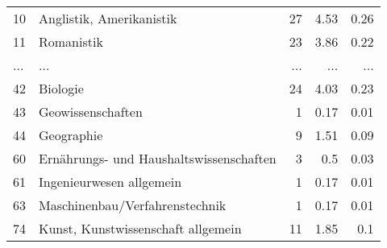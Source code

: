 \begin{longtable}{lXrrr}
        10 & \multicolumn{1}{X}{Anglistik, Amerikanistik} & %
          \num{27} &
          \num[round-mode=places,round-precision=2]{4,53} &
          \num[round-mode=places,round-precision=2]{0,26} \\
        11 & \multicolumn{1}{X}{Romanistik} & %
          \num{23} &
          \num[round-mode=places,round-precision=2]{3,86} &
          \num[round-mode=places,round-precision=2]{0,22} \\
       ... & ... & ... & ... & ... \\
        42 & \multicolumn{1}{X}{Biologie} & %
          \num{24} &
          \num[round-mode=places,round-precision=2]{4,03} &
          \num[round-mode=places,round-precision=2]{0,23} \\

        43 & \multicolumn{1}{X}{Geowissenschaften} & %
          \num{1} &
          \num[round-mode=places,round-precision=2]{0,17} &
          \num[round-mode=places,round-precision=2]{0,01} \\

        44 & \multicolumn{1}{X}{Geographie} & %
          \num{9} &
          \num[round-mode=places,round-precision=2]{1,51} &
          \num[round-mode=places,round-precision=2]{0,09} \\

        60 & \multicolumn{1}{X}{Ernährungs- und Haushaltswissenschaften} & %
          \num{3} &
          \num[round-mode=places,round-precision=2]{0,5} &
          \num[round-mode=places,round-precision=2]{0,03} \\

        61 & \multicolumn{1}{X}{Ingenieurwesen allgemein} & %
          \num{1} &
          \num[round-mode=places,round-precision=2]{0,17} &
          \num[round-mode=places,round-precision=2]{0,01} \\

        63 & \multicolumn{1}{X}{Maschinenbau/Verfahrenstechnik} & %
          \num{1} &
          \num[round-mode=places,round-precision=2]{0,17} &
          \num[round-mode=places,round-precision=2]{0,01} \\

        74 & \multicolumn{1}{X}{Kunst, Kunstwissenschaft allgemein} & %
          \num{11} &
          \num[round-mode=places,round-precision=2]{1,85} &
          \num[round-mode=places,round-precision=2]{0,1} \\


\end{longtable}
